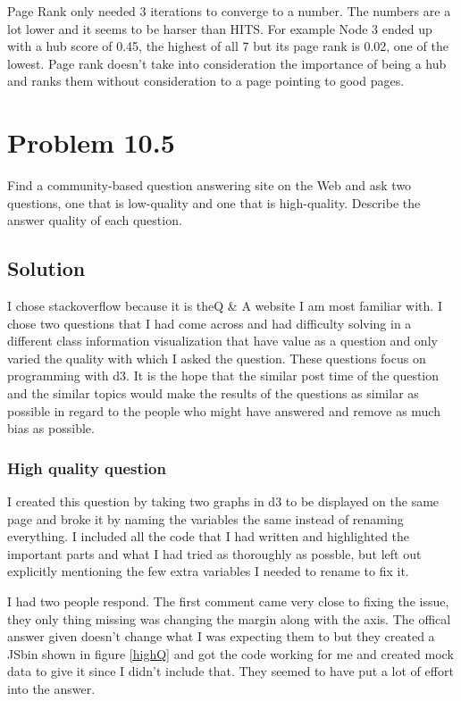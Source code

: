\documentclass[letterpaper,12pt]{article}
\begin{document}
Page Rank only needed 3 iterations to converge to a number. The numbers are a lot lower and it seems to be harser than HITS. For example Node 3 ended up with a hub score of 0.45, the highest of all 7 but its page rank is 0.02, one of the lowest. Page rank doesn't take into consideration the importance of being a hub and ranks them without consideration to a page pointing to good pages.
\pagebreak

\section{Problem 10.5}
Find a community-based question answering site on the Web and ask two questions, one that is low-quality and one that is high-quality. Describe the answer
quality of each question.

\subsection{Solution}

I chose stackoverflow because it is theQ \& A website I am most familiar with. I chose two questions that I had come across and had difficulty solving in a different class information visualization that have value as a question and only varied the quality with which I asked the question. These questions focus on programming with d3. It is the hope that the similar post time of the question and the similar topics would make the results of the questions as similar as possible in regard to the people who might have answered and remove as much bias as possible.

\subsubsection{High quality question}
I created this question by taking two graphs in d3 to be displayed on the same page and broke it by naming the variables the same instead of renaming everything. I included all the code that I had written and highlighted the important parts and what I had tried as thoroughly as possble, but left out explicitly mentioning the few extra variables I needed to rename to fix it.


I had two people respond. The first comment came very close to fixing the issue, they only thing missing was changing the margin along with the axis. The offical answer given doesn't change what I was expecting them to but they created a JSbin shown in figure \ref{highQ} and got the code working for me and created mock data to give it since I didn't include that. They seemed to have put a lot of effort into the answer.
\end{document}
